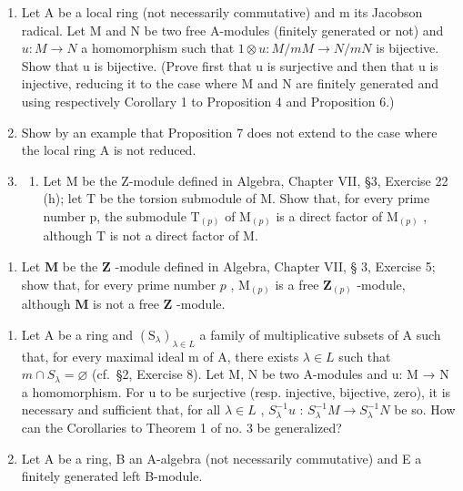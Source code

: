 \begin{enumerate}
\def\labelenumi{\arabic{enumi}.}
\setcounter{enumi}{3}
\item
  Let A be a local ring (not necessarily commutative) and m its Jacobson radical. Let M and N be two free A-modules (finitely generated or not) and \(u: M \rightarrow N\) a homomorphism such that \(1 \otimes u: M/mM \rightarrow N/mN\) is bijective. Show that u is bijective. (Prove first that u is surjective and then that u is injective, reducing it to the case where M and N are finitely generated and using respectively Corollary 1 to Proposition 4 and Proposition 6.)
\item
  Show by an example that Proposition 7 does not extend to the case where the local ring A is not reduced.
\item
  \begin{enumerate}
  \def\labelenumii{(\alph{enumii})}
  \tightlist
  \item
    Let M be the Z-module defined in Algebra, Chapter VII, §3, Exercise 22 (h); let T be the torsion submodule of M. Show that, for every prime number p, the submodule \(\mathrm{T}_{(p)}\) of \(\mathrm{M}_{(p)}\) is a direct factor of \(\mathrm{M}_{(p)}\) , although T is not a direct factor of M.
  \end{enumerate}
\end{enumerate}

\begin{enumerate}
\def\labelenumi{(\alph{enumi})}
\setcounter{enumi}{1}
\tightlist
\item
  Let \(\mathbf{M}\) be the \(\mathbf{Z}\) -module defined in Algebra, Chapter VII, § 3, Exercise 5; show that, for every prime number \(p\) , \(\mathrm{M}_{(p)}\) is a free \(\mathbf{Z}_{(p)}\) -module, although \(\mathbf{M}\) is not a free \(\mathbf{Z}\) -module.
\end{enumerate}

\begin{enumerate}
\def\labelenumi{\arabic{enumi}.}
\setcounter{enumi}{6}
\item
  Let A be a ring and \((\mathrm{S}_{\lambda})_{\lambda \in L}\) a family of multiplicative subsets of A such that, for every maximal ideal m of A, there exists \(\lambda \in L\) such that \(m \cap S_{\lambda} = \varnothing\) (cf.~§2, Exercise 8). Let M, N be two A-modules and u: M → N a homomorphism. For u to be surjective (resp. injective, bijective, zero), it is necessary and sufficient that, for all \(\lambda \in L\) , \(S_{\lambda}^{-1}u\) : \(S_{\lambda}^{-1}M \to S_{\lambda}^{-1}N\) be so. How can the Corollaries to Theorem 1 of no. 3 be generalized?
\item
  Let A be a ring, B an A-algebra (not necessarily commutative) and E a finitely generated left B-module.
\end{enumerate}

